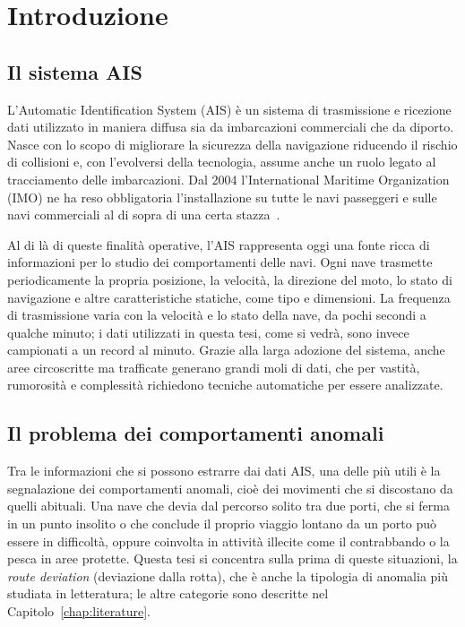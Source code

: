 \chapter{Introduzione}
\label{chap:introduction}

\section{Il sistema AIS}\label{sec:intro_ais}

L'Automatic Identification System (AIS) è un sistema di trasmissione e ricezione dati utilizzato in maniera
diffusa sia da imbarcazioni commerciali che da diporto.
Nasce con lo scopo di migliorare la sicurezza della navigazione riducendo il rischio di collisioni e,
con l'evolversi della tecnologia, assume anche un ruolo legato al tracciamento delle imbarcazioni.
Dal 2004 l'International Maritime Organization (IMO) ne ha reso obbligatoria l'installazione su tutte le navi
passeggeri e sulle navi commerciali al di sopra di una certa stazza~\cite{imo2004}.

Al di là di queste finalità operative, l'AIS rappresenta oggi una fonte ricca di informazioni per lo studio
dei comportamenti delle navi. Ogni nave trasmette periodicamente la propria posizione, la velocità,
la direzione del moto, lo stato di navigazione e altre caratteristiche statiche, come tipo e dimensioni.
La frequenza di trasmissione varia con la velocità e lo stato della nave, da pochi secondi a qualche minuto;
i dati utilizzati in questa tesi, come si vedrà, sono invece campionati a un record al minuto.
Grazie alla larga adozione del sistema, anche aree circoscritte ma trafficate generano grandi moli di dati,
che per vastità, rumorosità e complessità richiedono tecniche automatiche per essere analizzate.

\section{Il problema dei comportamenti anomali}\label{sec:intro_problem}

Tra le informazioni che si possono estrarre dai dati AIS, una delle più utili è la segnalazione dei
comportamenti anomali, cioè dei movimenti che si discostano da quelli abituali.
Una nave che devia dal percorso solito tra due porti, che si ferma in un punto insolito
o che conclude il proprio viaggio lontano da un porto può essere in difficoltà, oppure coinvolta in attività
illecite come il contrabbando o la pesca in aree protette.
Questa tesi si concentra sulla prima di queste situazioni, la \emph{route deviation} (deviazione dalla rotta),
che è anche la tipologia di anomalia più studiata in letteratura; le altre categorie sono descritte nel
Capitolo~\ref{chap:literature}.

